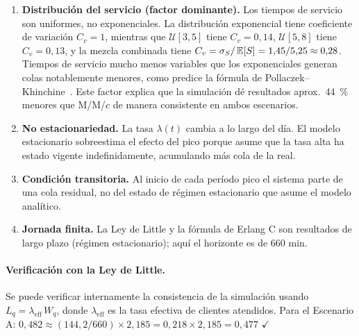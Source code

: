 \begin{enumerate}
  \item \textbf{Distribución del servicio (factor dominante).}
    Los tiempos de servicio son uniformes, no exponenciales.
    La distribución exponencial tiene coeficiente de variación $C_v = 1$,
    mientras que $\mathcal{U}[3,5]$ tiene $C_v = 0{,}14$,
    $\mathcal{U}[5,8]$ tiene $C_v = 0{,}13$, y la mezcla combinada tiene
    $C_v = \sigma_S / \operatorname{\mathbb{E}}[S] = 1{,}45 / 5{,}25 \approx 0{,}28$.
    Tiempos de servicio mucho menos variables que los exponenciales generan
    colas notablemente menores, como predice la fórmula de
    Pollaczek--Khinchine~\citep{ross2013simulation}.
    Este factor explica que la simulación dé resultados aprox.\ \SI{44}{\percent}
    menores que M/M/$c$ de manera consistente en ambos escenarios.

  \item \textbf{No estacionariedad.}
    La tasa $\lambda(t)$ cambia a lo largo del día.
    El modelo estacionario sobreestima el efecto del pico porque asume que la
    tasa alta ha estado vigente indefinidamente, acumulando más cola de la real.

  \item \textbf{Condición transitoria.}
    Al inicio de cada período pico el sistema parte de una cola residual, no del
    estado de régimen estacionario que asume el modelo analítico.

  \item \textbf{Jornada finita.}
    La Ley de Little y la fórmula de Erlang C son resultados de largo plazo
    (régimen estacionario); aquí el horizonte es de 660 min.
\end{enumerate}

\paragraph{Verificación con la Ley de Little.}
Se puede verificar internamente la consistencia de la simulación usando
$L_q = \lambda_{\text{eff}}\,W_q$, donde $\lambda_{\text{eff}}$ es la tasa
efectiva de clientes atendidos.
Para el Escenario A: $0{,}482 \approx (144{,}2 / 660) \times 2{,}185 = 0{,}218 \times 2{,}185 = 0{,}477$ $\checkmark$
